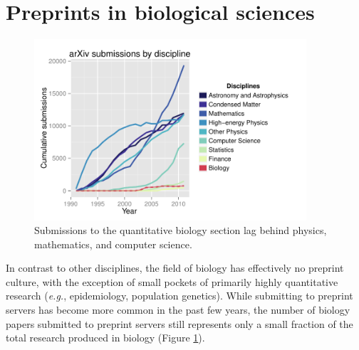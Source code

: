 \documentclass[letterpaper]{article}
\begin{document}
\section{Preprints in biological sciences}

\begin{figure}[ht!] \centering\includegraphics[width=0.90\textwidth]
{arxiv.pdf} \caption {Submissions to the quantitative biology section lag behind
physics, mathematics, and computer science.} \label{fig:arxiv} \end{figure}

In contrast to other disciplines, the field of biology has effectively no
preprint culture, with the exception of small pockets of primarily highly
quantitative research (\emph{e.g.}, epidemiology, population genetics).  While
submitting to preprint servers has become more common in the past few years, the
number of biology papers submitted to preprint servers still represents only a
small fraction of the total research produced in biology (Figure \ref{fig:arxiv}).
\end{document}
